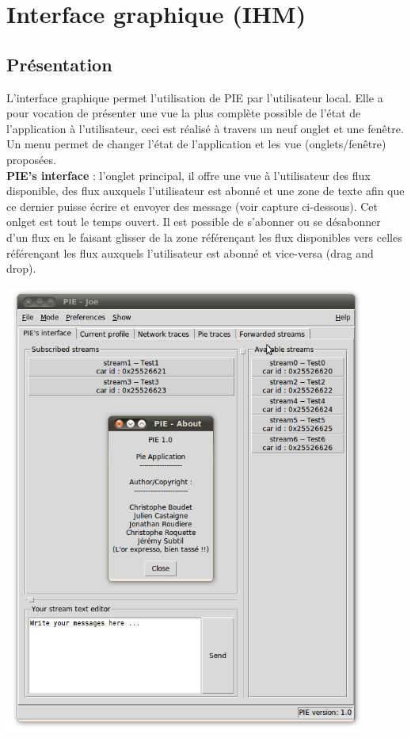 
\section{Interface graphique (IHM)}
\label{section:ihm}

\subsection{Présentation}

L'interface graphique permet l'utilisation de PIE par l'utilisateur local. Elle a pour vocation
de présenter une vue la plus complète possible de l'état de l'application à l'utilisateur, ceci
est réalisé à travers un neuf onglet et une fenêtre. Un menu permet de changer l'état de l'application
et les vue (onglets/fenêtre) proposées. \\

\textbf{PIE's interface} : l'onglet principal, il offre une vue à l'utilisateur des flux disponible,
des flux auxquels l'utilisateur est abonné et une zone de texte afin que ce dernier puisse écrire et
envoyer des message (voir capture ci-dessous). Cet onlget est tout le temps ouvert. Il est possible
de s'abonner ou se désabonner d'un flux en le faisant glisser de la zone référençant les flux disponibles
vers celles référençant les flux auxquels l'utilisateur est abonné et vice-versa (drag and drop).\\

\begin{center}
    \includegraphics[width=0.9\textwidth]{img/pie-main.png}
\end{center}

